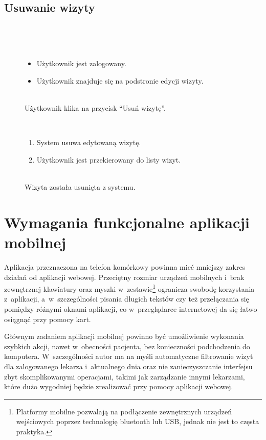 \documentclass[11pt]{aghdpl}
\begin{document}
\subsection{Usuwanie wizyty}

	\begin{description}
		\item[\useCaseAktor] \hfill \\
			\useCaseUzytkownik
		\item[\useCaseWarPocz] \hfill \\
			\begin{itemize}
				\item Użytkownik jest zalogowany.
				\item Użytkownik znajduje się na podstronie edycji wizyty.
			\end{itemize}
		\item[\useCaseZdarzInicj] \hfill \\
			Użytkownik klika na przycisk ``Usuń wizytę''.
		\item[\useCaseScenBaz] \hfill \\ 
			\begin{enumerate}
				\item System usuwa edytowaną wizytę.
				\item Użytkownik jest przekierowany do listy wizyt.
			\end{enumerate}
		\item[\useCaseWarKonc] \hfill \\ 
			Wizyta została usunięta z systemu.
	\end{description}

\section{Wymagania funkcjonalne aplikacji mobilnej}

Aplikacja przeznaczona na telefon komórkowy powinna mieć mniejszy zakres działań od aplikacji webowej. Przeciętny rozmiar urządzeń mobilnych i~brak zewnętrznej klawiatury oraz myszki w~zestawie\footnote{Platformy mobilne pozwalają na podłączenie zewnętrznych urządzeń wejściowych poprzez technologię bluetooth lub USB, jednak nie jest to częsta praktyka.} ogranicza swobodę korzystania z~aplikacji, a~w~szczególności pisania długich tekstów czy też przełączania się pomiędzy różnymi oknami aplikacji, co w~przeglądarce internetowej da się łatwo osiągnąć przy pomocy kart.

Głównym zadaniem aplikacji mobilnej powinno być umożliwienie wykonania szybkich akcji, nawet w~obecności pacjenta, bez konieczności podchodzenia do komputera. W~szczególności autor ma na myśli automatyczne filtrowanie wizyt dla zalogowanego lekarza i~aktualnego dnia oraz nie zanieczyszczanie interfejsu zbyt skomplikowanymi operacjami, takimi jak zarządzanie innymi lekarzami, które dużo wygodniej będzie zrealizować przy pomocy aplikacji webowej.
\end{document}
